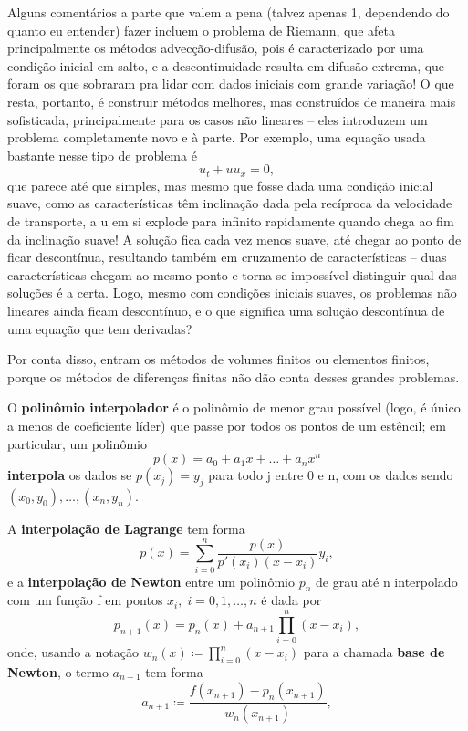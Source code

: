 \documentclass[../differential_methods.tex]{subfiles}
\begin{document}
Alguns comentários a parte que valem a pena (talvez apenas 1, dependendo do quanto eu entender) fazer incluem o problema de Riemann, que afeta principalmente os métodos advecção-difusão, pois é caracterizado por uma condição inicial em salto, e a descontinuidade resulta em difusão extrema, que foram os que sobraram pra lidar com dados iniciais com grande variação!
O que resta, portanto, é construir métodos melhores, mas construídos de maneira mais sofisticada, principalmente para os casos não lineares -- eles introduzem um problema completamente novo e à parte. Por exemplo, uma equação usada bastante nesse tipo de problema é
\[
	u_t + u u_x = 0,
\]
que parece até que simples, mas mesmo que fosse dada uma condição inicial suave, como as características têm inclinação dada pela recíproca da velocidade de transporte, a u em si explode para infinito rapidamente quando chega ao fim da inclinação suave! A solução fica cada vez menos suave, até chegar ao ponto de ficar descontínua, resultando também em cruzamento de características -- duas características chegam ao mesmo ponto e torna-se impossível distinguir qual das soluções é a certa.
Logo, mesmo com condições iniciais suaves, os problemas não lineares ainda ficam descontínuo, e o que significa uma solução descontínua de uma equação que tem derivadas?

Por conta disso, entram os métodos de volumes finitos ou elementos finitos, porque os métodos de diferenças finitas não dão conta desses grandes problemas.

\begin{tcolorbox}[
		skin=enhanced,
		title=Lembrete!,
		after title={\hfill Interpolação},
		fonttitle=\bfseries,
		sharp corners=downhill,
		colframe=black,
		colbacktitle=yellow!75!white,
		colback=yellow!30,
		colbacklower=black,
		coltitle=black,
		drop large lifted shadow
	]
	O \textbf{polinômio interpolador} é o polinômio de menor grau possível (logo, é único a menos de coeficiente líder) que passe por todos os pontos de um estêncil; em particular, um polinômio
	\[
		p(x) = a_{0}+ a_1x + \dotsc +a_{n}x^{n}
	\]
	\textbf{interpola} os dados se \(p(x_{j}) = y_{j}\) para todo j entre 0 e n, com os dados sendo \((x_{0}, y_{0}), \dotsc , (x_n, y_{n})\).

	A \textbf{interpolação de Lagrange} tem forma
	\[
		p(x) = \sum\limits_{i=0}^{n}\frac{p(x)}{p'(x_{i})(x-x_{i})}y_{i},
	\]
	e a \textbf{interpolação de Newton} entre um polinômio \(p_{n}\) de grau até n interpolado com um função f em pontos \(x_{i},\; i=0, 1, \dotsc , n\) é dada por
	\[
		p_{n+1}(x) = p_{n}(x) + a_{n+1} \prod\limits_{i=0}^{n}(x-x_{i}),
	\]
	onde, usando a notação \(w_{n}(x)\coloneqq \prod\limits_{i=0}^{n}(x-x_{i})\) para a chamada \textbf{base de Newton}, o termo \(a_{n+1}\) tem forma
	\[
		a_{n+1}\coloneqq \frac{f(x_{n+1}) - p_{n}(x_{n+1})}{w_{n}(x_{n+1})},
	\]
\end{tcolorbox}
\end{document}
